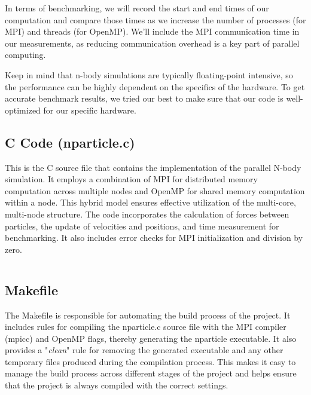 \documentclass{solutionclass} %
\begin{document}
In terms of benchmarking, we will record the start and end times of our computation and compare those times as we increase the number of processes (for MPI) and threads (for OpenMP). We'll include the MPI communication time in our measurements, as reducing communication overhead is a key part of parallel computing.

Keep in mind that n-body simulations are typically floating-point intensive, so the performance can be highly dependent on the specifics of the hardware. To get accurate benchmark results, we tried our best to make sure that our code is well-optimized for our specific hardware.

\setcounter{subsection}{0} %
\renewcommand{\thesubsection}{\arabic{subsection}} %

\subsection{C Code (nparticle.c)}
This is the C source file that contains the implementation of the parallel N-body simulation. It employs a combination of MPI for distributed memory computation across multiple nodes and OpenMP for shared memory computation within a node. This hybrid model ensures effective utilization of the multi-core, multi-node structure. The code incorporates the calculation of forces between particles, the update of velocities and positions, and time measurement for benchmarking. It also includes error checks for MPI initialization and division by zero.

\inputminted[firstline=1, lastline=132, linenos]{c}{nparticle.c}

\divider

\subsection{Makefile}
The Makefile is responsible for automating the build process of the project. It includes rules for compiling the nparticle.c source file with the MPI compiler (mpicc) and OpenMP flags, thereby generating the nparticle executable. It also provides a "\textit{clean}" rule for removing the generated executable and any other temporary files produced during the compilation process. This makes it easy to manage the build process across different stages of the project and helps ensure that the project is always compiled with the correct settings.
\end{document}
